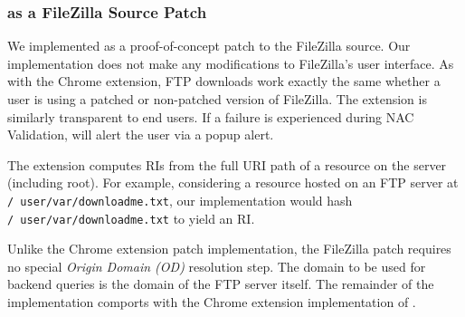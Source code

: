 
\subsubsection{\SYSTEM{} as a FileZilla Source Patch}

We implemented \SYSTEM{} as a proof-of-concept patch to the FileZilla source.
Our implementation does not make any modifications to FileZilla's user interface. As with the
Chrome extension, FTP downloads work exactly the same whether a user is using a
patched or non-patched version of FileZilla. The extension is similarly
transparent to end users. If a failure is experienced during NAC Validation,
\SYSTEM{} will alert the user via a popup alert.

The extension computes RIs from the full URI path of a resource on the server
(including root). For example, considering a resource hosted on an FTP server at
\texttt{/~user/var/downloadme.txt}, our implementation would hash
\texttt{/~user/var/downloadme.txt} to yield an RI.

Unlike the Chrome extension patch implementation, the FileZilla patch requires
no special \emph{Origin Domain (OD)} resolution step. The domain to be used for
backend queries is the domain of the FTP server itself. The remainder of the
implementation comports with the Chrome extension implementation of \SYSTEM{}.
